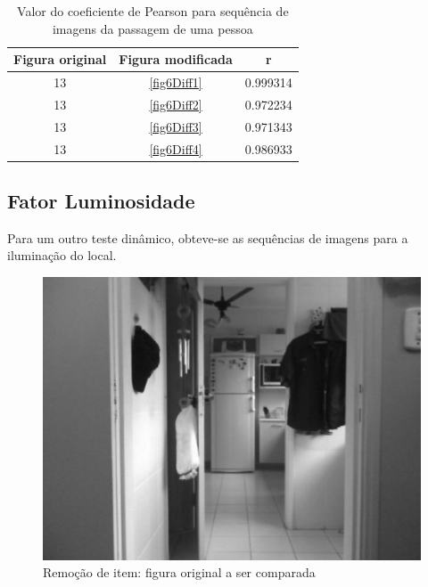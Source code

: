 \documentclass[10pt,a4paper]{article}
\begin{document}
\begin{table}[h!]
  \begin{center}
    \caption{Valor do coeficiente de Pearson para sequência de imagens
      da passagem de uma pessoa}
    \begin{tabular}{|c|c|c|}
      \hline
      Figura original & Figura modificada & r\\
      \hline
      13 &  \ref{fig6Diff1} & 0.999314\\
      13 &  \ref{fig6Diff2} & 0.972234\\
      13 &  \ref{fig6Diff3} & 0.971343\\
      13 &  \ref{fig6Diff4} & 0.986933\\
      \hline
    \end{tabular}
  \end{center}
\end{table}


\newpage
\subsection{Fator Luminosidade}
Para um outro teste dinâmico, obteve-se as sequências de imagens para
a iluminação do local.

\begin{figure}[h!]
\begin{center}
\includegraphics[scale=0.35]{photos/luzes/gBase}
\caption{Remoção de item: figura original a ser comparada}
\end{center}
\label{luzes}
\end{figure}
\end{document}
